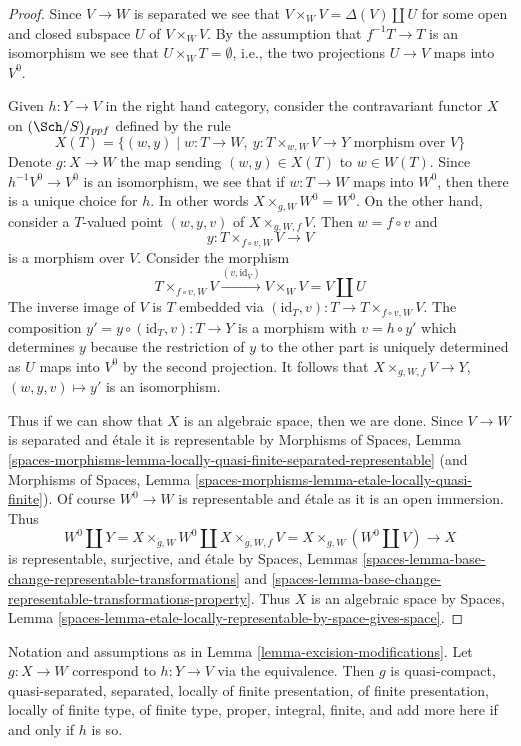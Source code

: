 \begin{proof}
Since $V \to W$ is separated we see that
$V \times_W V = \Delta(V) \amalg U$ for some open and closed subspace
$U$ of $V \times_W V$. By the assumption that $f^{-1}T \to T$ is an
isomorphism we see that $U \times_W T = \emptyset$, i.e., the two
projections $U \to V$ maps into $V^0$.

\medskip\noindent
Given $h : Y \to V$ in the right hand category, consider the
contravariant functor $X$ on $(\Sch/S)_{fppf}$ defined by the rule
$$
X(T) = \{(w, y) \mid
w :  T \to W,\ y : T \times_{w, W} V \to Y\text{ morphism over }V\}
$$
Denote $g : X \to W$ the map sending $(w, y) \in X(T)$ to $w \in W(T)$.
Since $h^{-1}V^0 \to V^0$ is an isomorphism, we see that if
$w : T \to W$ maps into $W^0$, then there is a unique choice for $h$.
In other words $X \times_{g, W} W^0 = W^0$. On the other hand, consider
a $T$-valued point $(w, y, v)$ of $X \times_{g, W, f} V$.
Then $w = f \circ v$ and
$$
y : T \times_{f \circ v, W} V \longrightarrow V
$$
is a morphism over $V$. Consider the morphism
$$
T \times_{f \circ v, W} V \xrightarrow{(v, \text{id}_V)}
V \times_W V = V \amalg U
$$
The inverse image of $V$ is $T$ embedded via
$(\text{id}_T, v) : T \to T \times_{f \circ v, W} V$.
The composition $y' = y \circ (\text{id}_T, v) : T \to Y$
is a morphism with $v = h \circ y'$ which determines $y$ because the
restriction of $y$ to the other part is uniquely determined as
$U$ maps into $V^0$ by the second projection. It follows that
$X \times_{g, W, f} V \to Y$, $(w, y, v) \mapsto y'$ is an isomorphism.

\medskip\noindent
Thus if we can show that $X$ is an algebraic space, then we are done.
Since $V \to W$ is separated and \'etale it is representable by
Morphisms of Spaces, Lemma
\ref{spaces-morphisms-lemma-locally-quasi-finite-separated-representable}
(and Morphisms of Spaces, Lemma
\ref{spaces-morphisms-lemma-etale-locally-quasi-finite}).
Of course $W^0 \to W$ is representable and \'etale as it is an
open immersion. Thus
$$
W^0 \amalg Y = X \times_{g, W} W^0 \amalg X \times_{g, W, f} V
= X \times_{g, W} (W^0 \amalg V) \longrightarrow X
$$
is representable, surjective, and \'etale by Spaces, Lemmas
\ref{spaces-lemma-base-change-representable-transformations} and
\ref{spaces-lemma-base-change-representable-transformations-property}.
Thus $X$ is an algebraic
space by Spaces, Lemma
\ref{spaces-lemma-etale-locally-representable-by-space-gives-space}.
\end{proof}

\begin{lemma}
\label{lemma-excision-modifications-properties}
Notation and assumptions as in Lemma \ref{lemma-excision-modifications}.
Let $g : X \to W$ correspond to $h : Y \to V$ via the equivalence.
Then $g$ is quasi-compact, quasi-separated, separated, locally of finite
presentation, of finite presentation, locally of finite type, of finite type,
proper, integral, finite, and add more here if and only if
$h$ is so.
\end{lemma}

